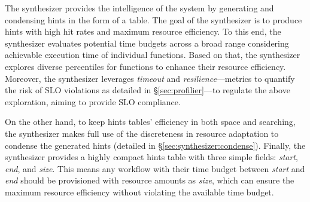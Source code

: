 The synthesizer provides the intelligence of the system by generating and condensing hints in the form of a table.
The goal of the synthesizer is to produce hints with high hit rates and maximum resource efficiency.  
To this end, the synthesizer evaluates potential time budgets across a broad range considering achievable execution time of individual functions.
Based on that, the synthesizer explores diverse percentiles for functions to enhance their resource efficiency.
Moreover, the synthesizer leverages \emph{timeout} and \emph{resilience}---metrics to quantify the risk of SLO violations as detailed in \S\ref{sec:profilier}---to regulate the above exploration, aiming to provide SLO compliance.

On the other hand, to keep hints tables' efficiency in both space and searching, the synthesizer makes full use of the discreteness in resource adaptation 
to condense the generated hints (detailed in \S\ref{sec:synthesizer:condense}).
Finally, the synthesizer provides a highly compact hints table with three simple fields: \textit{start}, \textit{end}, and \textit{size}.
This means any workflow with their time budget between \textit{start} and \textit{end} should be provisioned with resource amounts as \textit{size}, which can ensure the maximum resource efficiency without violating the available time budget.




